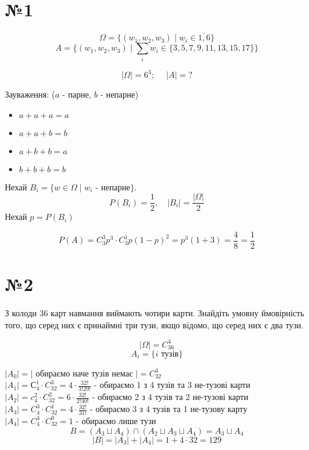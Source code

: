 \documentclass[11pt, a4paper]{article} %
\begin{document}
\section*{№1}
$$\Omega = \{(w_1,w_2,w_3)\;|\; w_i \in \overline{1,6}\}$$
$$A = \{(w_1,w_2,w_3)\;|\; \sum_i w_i \in \{3,5,7,9,11,13,15,17\}\}$$

$$|\Omega| = 6^3;\;\quad |A| = ?$$

Зауваження: ($a$ - парне, $b$ - непарне)
\begin{itemize}
    \item $a + a + a = a$
    \item $a + a + b = b$
    \item $a + b + b = a$
    \item $b + b + b = b$
\end{itemize}

Нехай $B_i = \{w\in\Omega\;|\; w_i \text{ - непарне}\}$.
$$P(B_i) = \frac{1}{2}, \quad|B_i| = \frac{|\Omega|}{2}$$
Нехай $p = P(B_i)$

\begin{mdframed}[style=ans]
    $$P(A) = C_3^3 p^3 \cdot C_3^1 p(1-p)^2 = p^3 (1 + 3) = \frac{4}{8} = \frac{1}{2} $$
\end{mdframed}

\section*{№2}
\begin{mdframed}
    З колоди 36 карт навмання виймають чотири карти. Знайдіть умовну
ймовірність того, що серед них є принаймні три тузи, якщо відомо, що серед
них є два тузи.
\end{mdframed}

$$|\Omega| = C_36^4$$
$$A_i = \{i \text{ тузів}\}$$


$|A_0| = |$ обираємо наче тузів немає $| = C_{32}^4$ \\
$|A_1| = С_4^1\cdot C_{32}^3 = 4\cdot \frac{32!}{3!29!}$ - обираємо 1 з 4 тузів та 3 не-тузові карти\\ 
$|A_2| = c_4^2\cdot C_{32}^2 = 6\cdot \frac{32!}{2!30!}$ - обираємо 2 з 4 тузів та 2 не-тузові карти\\ 
$|A_3| = C_4^3\cdot C_{32}^1 = 4\cdot \frac{32!}{31!}$ - обираємо 3 з 4 тузів та 1 не-тузову карту\\ 
$|A_4| = C_4^4\cdot C_{32}^0 = 1$ - обираємо лише тузи\\

$$B = (A_3 \sqcup A_4) \cap (A_2 \sqcup A_3 \sqcup A_4) = A_3 \sqcup A_4$$
$$|B| = |A_3|+|A_4| = 1 + 4\cdot 32 = 129$$
\end{document}
